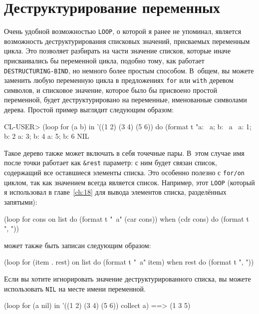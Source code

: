 \section{Деструктурирование переменных}

Очень удобной возможностью \lstinline{LOOP}, о которой я ранее не упоминал, является
возможность деструктурирования списковых значений, присваемых переменным цикла. Это
позволяет разбирать на части значение списков, которые иначе присваивались бы переменной
цикла, подобно тому, как работает \lstinline{DESTRUCTURING-BIND}, но немного более простым
способом. В~общем, вы можете заменить любую переменную цикла в предложениях \lstinline{for} или
\lstinline{with} деревом символов, и списковое значение, которое было бы присвоено простой
переменной, будет деструктурировано на переменные, именованные символами дерева. Простой
пример выглядит следующим образом:

\begin{myverb}
CL-USER> (loop for (a b) in '((1 2) (3 4) (5 6))
            do (format t "a: ~a; b: ~a~%
a: 1; b: 2
a: 3; b: 4
a: 5; b: 6
NIL
\end{myverb}

Такое дерево также может включать в себя точечные пары. В~этом случае имя после точки
работает как \lstinline!&rest! параметр: с ним будет связан список, содержащий все
оставшиеся элементы списка. Это особенно полезно с \lstinline{for/on} циклом, так как значением
всегда является список. Например, этот \lstinline{LOOP} (который я использовал в
главе~\ref{ch:18} для вывода элементов списка, разделённых запятыми):

\begin{myverb}
(loop for cons on list
    do (format t "~a" (car cons))
    when (cdr cons) do (format t ", "))
\end{myverb}

\noindent{}может также быть записан следующим образом:

\begin{myverb}
(loop for (item . rest) on list
    do (format t "~a" item)
    when rest do (format t ", "))
\end{myverb}

Если вы хотите игнорировать значение деструктурированного списка, вы можете использовать
\lstinline{NIL} на месте имени переменной.

\begin{myverb}
  (loop for (a nil) in '((1 2) (3 4) (5 6)) collect a) ==> (1 3 5)
\end{myverb}

